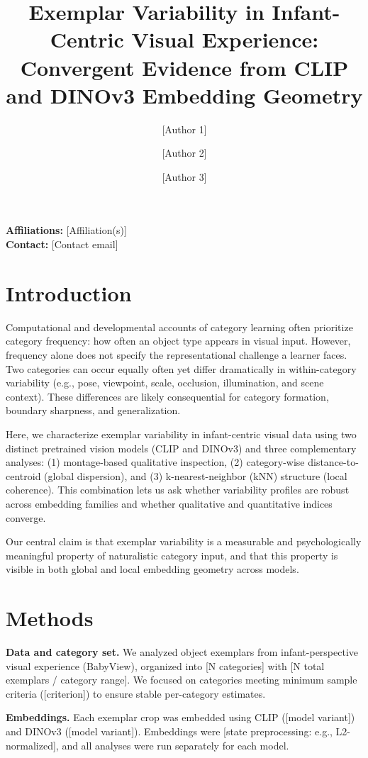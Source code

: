 \documentclass[11pt]{article}
\title{Exemplar Variability in Infant-Centric Visual Experience: Convergent Evidence from CLIP and DINOv3 Embedding Geometry}
\author{[Author 1] \and [Author 2] \and [Author 3]}
\date{}
\begin{document}
\maketitle

\noindent\textbf{Affiliations:} [Affiliation(s)]\\
\textbf{Contact:} [Contact email]

\section*{Introduction}
Computational and developmental accounts of category learning often prioritize category frequency: how often an object type appears in visual input. However, frequency alone does not specify the representational challenge a learner faces. Two categories can occur equally often yet differ dramatically in within-category variability (e.g., pose, viewpoint, scale, occlusion, illumination, and scene context). These differences are likely consequential for category formation, boundary sharpness, and generalization.

Here, we characterize exemplar variability in infant-centric visual data using two distinct pretrained vision models (CLIP and DINOv3) and three complementary analyses: (1) montage-based qualitative inspection, (2) category-wise distance-to-centroid (global dispersion), and (3) k-nearest-neighbor (kNN) structure (local coherence). This combination lets us ask whether variability profiles are robust across embedding families and whether qualitative and quantitative indices converge.

Our central claim is that exemplar variability is a measurable and psychologically meaningful property of naturalistic category input, and that this property is visible in both global and local embedding geometry across models.

\section*{Methods}
\textbf{Data and category set.}
We analyzed object exemplars from infant-perspective visual experience (BabyView), organized into [N categories] with [N total exemplars / category range]. We focused on categories meeting minimum sample criteria ([criterion]) to ensure stable per-category estimates.

\textbf{Embeddings.}
Each exemplar crop was embedded using CLIP ([model variant]) and DINOv3 ([model variant]). Embeddings were [state preprocessing: e.g., L2-normalized], and all analyses were run separately for each model.
\end{document}
